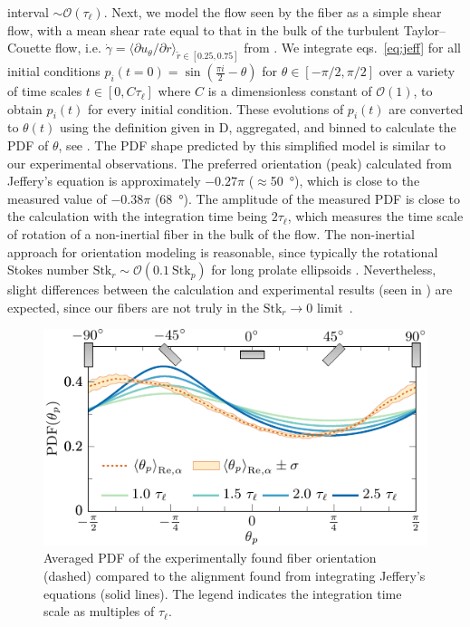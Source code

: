 interval $\sim \mathcal{O}(\tau_\ell)$. Next, we model the flow seen by the
fiber as a simple shear flow, with a mean shear rate equal to that in the bulk
of the turbulent Taylor--Couette flow, i.e.
$\dot \gamma = \langle \partial u_\theta / \partial r \rangle_{\tilde{r}\in[0.25,0.75]}$ from
. We integrate eqs.~\ref{eq:jeff} for all initial
conditions $p_i(t=0) = \sin \left(\frac{\pi  i}{2}-\theta \right)$ for 
$\theta \in [-\pi/2,\pi/2]$ over a variety of time scales $t \in [0,C\tau_\ell]$ where
$C$ is a dimensionless constant of $\mathcal{O}(1)$, to obtain $p_i(t)$ for
every initial condition. These evolutions of $p_i(t)$ are converted to
$\theta(t)$ using the definition given in D, aggregated,
and binned to calculate the PDF of $\theta$, see .
The PDF shape predicted by  this simplified model is similar to our
experimental observations. The preferred orientation (peak) calculated from
Jeffery's equation is approximately $-0.27\pi$ ($\approx$\SI{50}{\degree}), which is close to the measured
value of $-0.38\pi$ (\SI{68}{\degree}). The amplitude of the measured PDF is close to the
calculation with the integration time being $2 \tau_\ell$, which measures the
time scale of rotation of a non-inertial fiber in the bulk of the flow. The
non-inertial approach for orientation modeling
is reasonable, since typically the rotational Stokes number 
$\text{Stk}_r \sim \mathcal{O}(0.1 \ \text{Stk}_p)$ for long prolate ellipsoids \cite{Zhao2015}.
Nevertheless, slight differences between the calculation and experimental
results (seen in ) are expected, since our fibers
are not truly in the $\text{Stk}_r \to 0$ limit~\cite{Challabotla2015b}.\\%
%
\begin{figure}[htp]
\centering
\includegraphics{figure10Jeffery}
\caption{Averaged PDF of the experimentally found fiber orientation (dashed)
compared to the alignment found from integrating Jeffery's equations (solid
lines). The legend indicates the integration time scale as multiples of
$\tau_\ell$.}
\label{fig:fiberjeffery}
\end{figure}%
